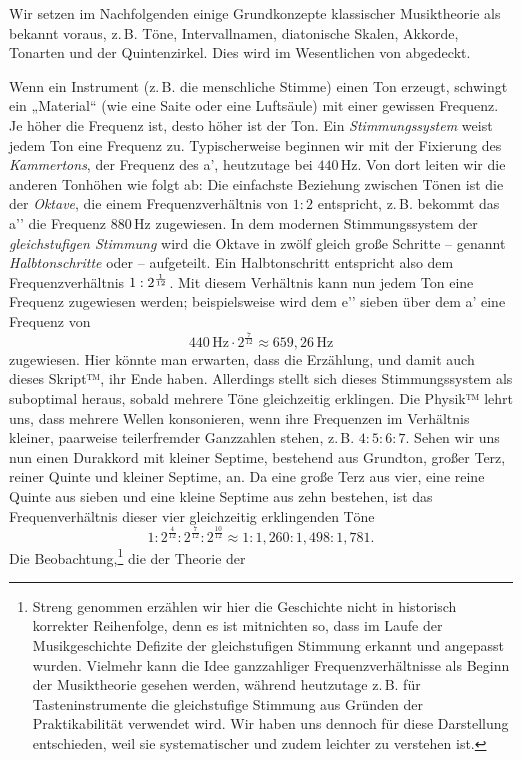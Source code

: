 Wir setzen im Nachfolgenden einige Grundkonzepte klassischer Musiktheorie als
bekannt voraus, z.\,B. Töne, Intervallnamen, diatonische Skalen, Akkorde,
Tonarten und der Quintenzirkel. Dies wird im Wesentlichen von
\cite[§\,1–6]{Skript} abgedeckt.

Wenn ein Instrument (z.\,B. die menschliche Stimme) einen Ton erzeugt, schwingt
ein „Material“ (wie eine Saite oder eine Luftsäule) mit einer gewissen Frequenz.
Je höher die Frequenz ist, desto höher ist der Ton. Ein \emph{Stimmungssystem}
weist jedem Ton eine Frequenz zu. Typischerweise beginnen wir mit der Fixierung
des \emph{Kammertons}, der Frequenz des a’, heutzutage bei $440$\,Hz. Von dort
leiten wir die anderen Tonhöhen wie folgt ab: Die einfachste Beziehung zwischen
Tönen ist die der \emph{Oktave}, die einem Frequenzverhältnis von $1:2$
entspricht, z.\,B. bekommt das a’’ die Frequenz $880$\,Hz zugewiesen. In dem
modernen Stimmungssystem der \emph{gleichstufigen Stimmung} wird die Oktave in
zwölf gleich große Schritte – genannt \emph{Halbtonschritte} oder  – 
aufgeteilt. Ein Halbtonschritt entspricht also dem Frequenzverhältnis
$1:2^{\smash{\frac1{12}}}$. Mit diesem Verhältnis kann nun jedem Ton eine
Frequenz zugewiesen werden; beispielsweise wird dem e’’ sieben 
über dem a’ eine Frequenz von 
\[440\,\text{Hz}\cdot 2^{\frac7{12}} \approx 659{,}26\,\text{Hz}\]%
zugewiesen. Hier könnte man erwarten, dass die Erzählung, und damit auch dieses
Skript™, ihr Ende haben. Allerdings stellt sich dieses Stimmungssystem als
suboptimal heraus, sobald mehrere Töne gleichzeitig erklingen. Die Physik™ lehrt
uns, dass mehrere Wellen konsonieren, wenn ihre Frequenzen im Verhältnis
kleiner, paarweise teilerfremder Ganzzahlen stehen, z.\,B. $4:5:6:7$. Sehen wir
uns nun einen Durakkord mit kleiner Septime, bestehend aus Grundton, großer Terz,
reiner Quinte und kleiner Septime, an. Da eine große Terz aus vier, eine reine
Quinte aus sieben und eine kleine Septime aus zehn  bestehen, ist das
Frequenverhältnis dieser vier gleichzeitig erklingenden Töne %
\[1:2^{\frac4{12}}:2^{\frac7{12}}:2^{\frac{10}{12}}\approx
  1:1{,}260:1{,}498:1{,}781.\]%
Die Beobachtung,\footnote{Streng genommen erzählen wir hier die Geschichte nicht
  in historisch korrekter Reihenfolge, denn es ist mitnichten so, dass im Laufe
  der Musikgeschichte Defizite der gleichstufigen Stimmung erkannt und angepasst
  wurden. Vielmehr kann die Idee ganzzahliger Frequenzverhältnisse als Beginn
  der Musiktheorie gesehen werden, während heutzutage z.\,B. für
  Tasteninstrumente die gleichstufige Stimmung aus Gründen der Praktikabilität
  verwendet wird. Wir haben uns dennoch für diese Darstellung entschieden, weil
  sie systematischer und zudem leichter zu verstehen ist.} die der Theorie der
